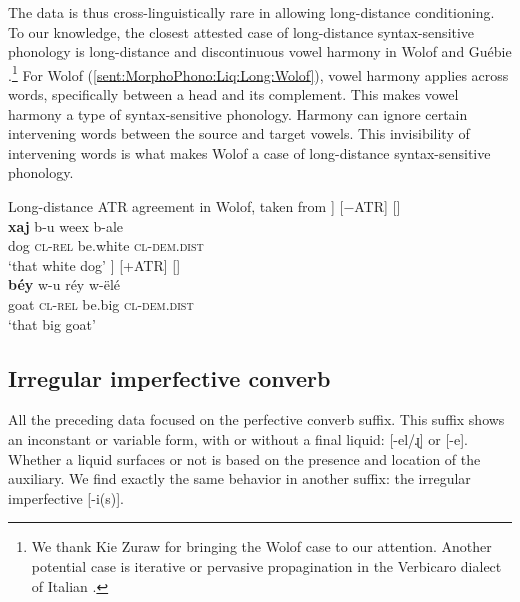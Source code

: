\begin{sloppypar}
The {\iaIA} data is thus cross-linguistically rare in allowing long-distance conditioning. To our knowledge, the closest attested case of long-distance syntax-sensitive phonology is  long-distance and discontinuous vowel harmony in Wolof \citep{Sy-2005-UltraLongDitanceATRAgreementWolof} and Guébie \citep{DąbkowskiSande-2021-HandoutPhonologySyntaxInterleavingGuebieFocusFronting}.\footnote{We thank Kie Zuraw for bringing the Wolof case to our attention. Another potential case is iterative or pervasive propagination in the Verbicaro dialect  of Italian \citep[7]{Silvestri-2022-ItalianDialectPhonologySyntaxinterfaceCasePropagination}.  } For Wolof (\ref{sent:MorphoPhono:Liq:Long:Wolof}),    vowel harmony applies across words, specifically between a head and its complement. This makes vowel harmony a type of syntax-sensitive phonology. Harmony can ignore certain intervening words between the source and target vowels. This invisibility of intervening words is what makes Wolof  a case of long-distance syntax-sensitive phonology. 
\end{sloppypar}

\begin{exe}
	\ex Long-distance ATR agreement in Wolof, taken from \citet[95, (1)]{Sy-2005-UltraLongDitanceATRAgreementWolof} \label{sent:MorphoPhono:Liq:Long:Wolof}
	\bigskip %
	\let\eachwordone\bfseries %
	\ea \glll [\SyExampleNode[SyExatr1]{−ATR}] {}  [−ATR] []\\
			  \textbf{xaj} b-u weex b-ale\\
			  dog \textsc{cl-rel} be.white \textsc{cl-dem.dist}\\
  		 \glt `that white dog'
	\bigskip\ex \glll [\SyExampleNode[SyExatr3]{+ATR}] {} [+ATR] []\\
		\textbf{béy} w-u réy w-ëlé\\
		goat \textsc{cl-rel} be.big \textsc{cl-dem.dist}\\
		\glt `that big goat'	
	\z
\end{exe}


\subsection{Irregular imperfective converb}\label{section:morphophono:auxiliary:imperfective}
All the preceding data focused on the perfective converb suffix. This suffix shows an inconstant or variable form, with or without a final liquid: [-el/ɻ] or [-e]. Whether a liquid surfaces or not is based   on the presence and location of the auxiliary. We find exactly the same behavior in another suffix: the irregular imperfective [-i(s)]. 

